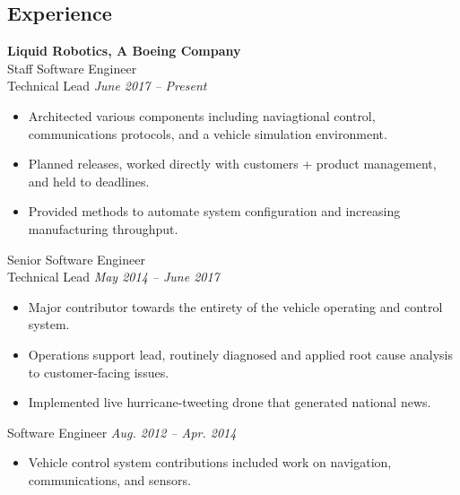 \documentclass{article}
\begin{document}
{\begin{multicols}{2}
\section*{Experience}
\noindent
    \textbf{Liquid Robotics, A Boeing Company}\\
    Staff Software Engineer\\
    Technical Lead \hfill \textsl{June 2017 -- Present} \\
    \vspace{ -10px}
    \begin{itemize}[noitemsep,nolistsep]
        \item Architected various components including naviagtional control, communications protocols, and a vehicle simulation environment.
        \item Planned releases, worked directly with customers + product management, and held to deadlines.
        \item Provided methods to automate system configuration and increasing manufacturing throughput.
    \end{itemize}
    \vspace{10px}
    Senior Software Engineer\\
    Technical Lead \hfill \textsl{May 2014 -- June 2017} \\
    \vspace{ -10px}
    \begin{itemize}[noitemsep,nolistsep]
    	\item Major contributor towards the entirety of the vehicle operating and control system.
         \item Operations support lead, routinely diagnosed and applied root cause analysis to customer-facing issues.
         \item Implemented live hurricane-tweeting drone that generated national news.
    \end{itemize}
    \vspace{10px}
    Software Engineer \hfill \textsl{Aug. 2012 -- Apr. 2014}\\
    \vspace{ -10px}
    \begin{itemize}[noitemsep,nolistsep]
        \item Vehicle control system contributions included work on navigation, communications, and sensors.

\end{itemize}
\end{multicols}}
\end{document}
